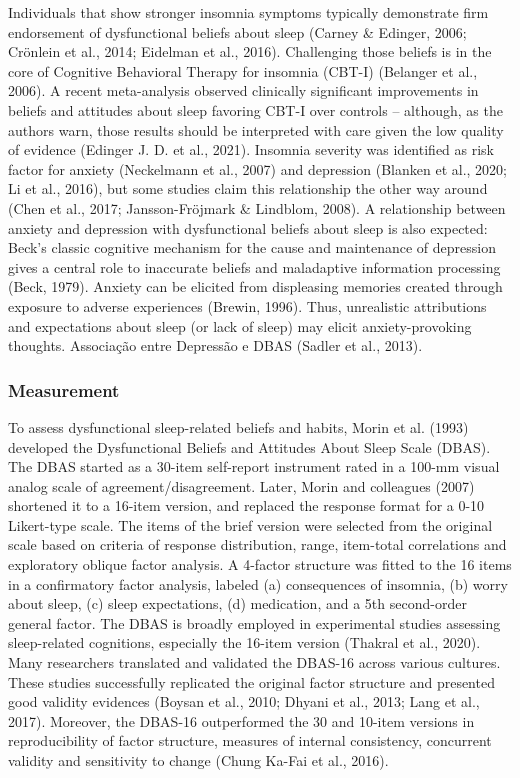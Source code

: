 \documentclass[
  ,doc,11pt, twoside,floatsintext]{apa6}
\begin{document}
Individuals that show stronger insomnia symptoms typically demonstrate firm endorsement of dysfunctional beliefs about sleep (Carney \& Edinger, 2006; Crönlein et al., 2014; Eidelman et al., 2016). Challenging those beliefs is in the core of Cognitive Behavioral Therapy for insomnia (CBT-I) (Belanger et al., 2006). A recent meta-analysis observed clinically significant improvements in beliefs and attitudes about sleep favoring CBT-I over controls -- although, as the authors warn, those results should be interpreted with care given the low quality of evidence (Edinger J. D. et al., 2021). Insomnia severity was identified as risk factor for anxiety (Neckelmann et al., 2007) and depression (Blanken et al., 2020; Li et al., 2016), but some studies claim this relationship the other way around (Chen et al., 2017; Jansson-Fröjmark \& Lindblom, 2008). A relationship between anxiety and depression with dysfunctional beliefs about sleep is also expected: Beck's classic cognitive mechanism for the cause and maintenance of depression gives a central role to inaccurate beliefs and maladaptive information processing (Beck, 1979). Anxiety can be elicited from displeasing memories created through exposure to adverse experiences (Brewin, 1996). Thus, unrealistic attributions and expectations about sleep (or lack of sleep) may elicit anxiety-provoking thoughts. Associação entre Depressão e DBAS (Sadler et al., 2013).

\hypertarget{measurement}{%
\subsubsection{Measurement}\label{measurement}}

To assess dysfunctional sleep-related beliefs and habits, Morin et al. (1993) developed the Dysfunctional Beliefs and Attitudes About Sleep Scale (DBAS). The DBAS started as a 30-item self-report instrument rated in a 100-mm visual analog scale of agreement/disagreement. Later, Morin and colleagues (2007) shortened it to a 16-item version, and replaced the response format for a 0-10 Likert-type scale. The items of the brief version were selected from the original scale based on criteria of response distribution, range, item-total correlations and exploratory oblique factor analysis. A 4-factor structure was fitted to the 16 items in a confirmatory factor analysis, labeled (a) consequences of insomnia, (b) worry about sleep, (c) sleep expectations, (d) medication, and a 5th second-order general factor. The DBAS is broadly employed in experimental studies assessing sleep-related cognitions, especially the 16-item version (Thakral et al., 2020). Many researchers translated and validated the DBAS-16 across various cultures. These studies successfully replicated the original factor structure and presented good validity evidences (Boysan et al., 2010; Dhyani et al., 2013; Lang et al., 2017). Moreover, the DBAS-16 outperformed the 30 and 10-item versions in reproducibility of factor structure, measures of internal consistency, concurrent validity and sensitivity to change (Chung Ka-Fai et al., 2016).
\end{document}
